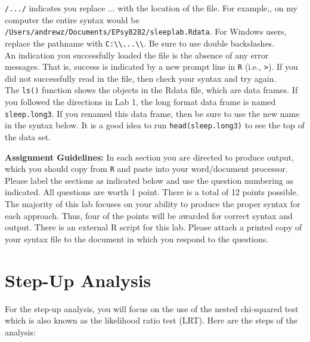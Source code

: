 \documentclass[]{article}
\begin{document}
\noindent \verb,/.../, indicates you replace $\ldots$ with the location of the file. For example,, on my computer the entire syntax would be \texttt{/Users/andrewz/Documents/EPsy8282/sl\allowbreak eeplab.Rdata}. For Windows users, replace the pathname with \verb,C:\\...\\,. Be sure to use double backslashes. \\
\linebreak
An indication you successfully loaded the file is the absence of any error messages. That is, success is indicated by a new prompt line in \texttt{R} (i.e., \texttt{>}). If you did not successfully read in the file, then check your syntax and try again. \\
\linebreak
The \texttt{ls()} function shows the objects in the Rdata file, which are data frames. If you followed the directions in Lab 1, the long format data frame is named \texttt{sleep.long3}. If you renamed this data frame, then be sure to use the new name in the syntax below. It is a good idea to run \texttt{head(sleep.long3)} to see the top of the data set.\\
\linebreak


\noindent\textbf{Assignment Guidelines:} In each section you are directed to produce output, which you should copy from \texttt{R} and paste into your word/document processor. Please label the sections as indicated below and use the question numbering as indicated. All questions are worth 1 point. There is a total of 12 points possible. The majority of this lab focuses on your ability to produce the proper syntax for each approach. Thus, four of the points will be awarded for correct syntax and output. There is an external R script for this lab. Please attach a printed copy of your syntax file to the document in which you respond to the questions.

%
%

\section*{Step-Up Analysis} 
 
\noindent For the step-up analysis, you will focus on the use of the nested chi-squared test which is also known as the likelihood ratio test (LRT). Here are the steps of the analysis:
\end{document}
